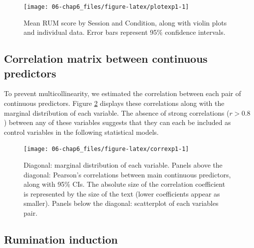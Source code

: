 \documentclass[a4paper,12pt,twoside,onecolumn,openright,final,oldfontcommands]{memoir}
\begin{document}
\begin{figure}[ht]

{\centering \texttt{[image: 06-chap6\_files/figure-latex/plotexp1-1]} 

}

\caption{Mean RUM score by Session and Condition, along with violin plots and individual data. Error bars represent 95\% confidence intervals.}\label{fig:plotexp1}
\end{figure}

\hypertarget{correlation-matrix-between-continuous-predictors}{%
\subsection{Correlation matrix between continuous predictors}\label{correlation-matrix-between-continuous-predictors}}

To prevent multicollinearity, we estimated the correlation between each pair of continuous predictors. Figure \ref{fig:correxp1} displays these correlations along with the marginal distribution of each variable. The absence of strong correlations (\(r > 0.8\)) between any of these variables suggests that they can each be included as control variables in the following statistical models.

\begin{figure}[ht]

{\centering \texttt{[image: 06-chap6\_files/figure-latex/correxp1-1]} 

}

\caption{Diagonal: marginal distribution of each variable. Panels above the diagonal: Pearson's correlations between main continuous predictors, along with 95\% CIs. The absolute size of the correlation coefficient is represented by the size of the text (lower coefficients appear as smaller). Panels below the diagonal: scatterplot of each variables pair.}\label{fig:correxp1}
\end{figure}

\hypertarget{rumination-induction-3}{%
\subsection{Rumination induction}\label{rumination-induction-3}}
\end{document}
